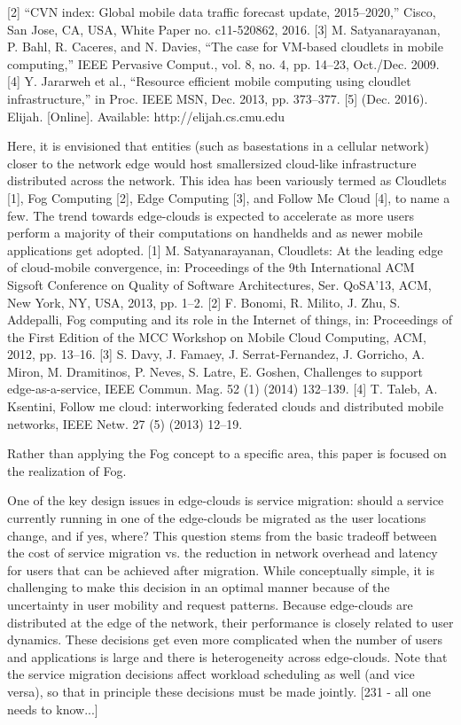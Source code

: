 [2] “CVN index: Global mobile data traffic forecast update, 2015–2020,”
Cisco, San Jose, CA, USA, White Paper no. c11-520862, 2016.
[3] M. Satyanarayanan, P. Bahl, R. Caceres, and N. Davies, “The case for
VM-based cloudlets in mobile computing,” IEEE Pervasive Comput.,
vol. 8, no. 4, pp. 14–23, Oct./Dec. 2009.
[4] Y. Jararweh et al., “Resource efficient mobile computing using cloudlet
infrastructure,” in Proc. IEEE MSN, Dec. 2013, pp. 373–377.
[5] (Dec. 2016). Elijah. [Online]. Available: http://elijah.cs.cmu.edu




Here,
it is envisioned that entities (such as basestations in a cellular network) closer to the network edge would host smallersized
cloud-like infrastructure distributed across the network. This idea has been variously termed as Cloudlets [1], Fog Computing [2], Edge Computing [3], and Follow Me Cloud [4], to name a few. The trend towards edge-clouds is expected
to accelerate as more users perform a majority of their computations on handhelds and as newer mobile applications get
adopted.
[1] M. Satyanarayanan, Cloudlets: At the leading edge of cloud-mobile convergence, in: Proceedings of the 9th International ACM Sigsoft Conference on
Quality of Software Architectures, Ser. QoSA’13, ACM, New York, NY, USA, 2013, pp. 1–2.
[2] F. Bonomi, R. Milito, J. Zhu, S. Addepalli, Fog computing and its role in the Internet of things, in: Proceedings of the First Edition of the MCC Workshop
on Mobile Cloud Computing, ACM, 2012, pp. 13–16.
[3] S. Davy, J. Famaey, J. Serrat-Fernandez, J. Gorricho, A. Miron, M. Dramitinos, P. Neves, S. Latre, E. Goshen, Challenges to support edge-as-a-service, IEEE
Commun. Mag. 52 (1) (2014) 132–139.
[4] T. Taleb, A. Ksentini, Follow me cloud: interworking federated clouds and distributed mobile networks, IEEE Netw. 27 (5) (2013) 12–19.


Rather than applying
the Fog concept to a specific area, this paper is focused on
the realization of Fog.

One of the key design issues in edge-clouds is service migration: should a service currently running in one of the edge-clouds
be migrated as the user locations change, and if yes, where? This question stems from the basic tradeoff between the
cost of service migration vs. the reduction in network overhead and latency for users that can be achieved after migration.
While conceptually simple, it is challenging to make this decision in an optimal manner because of the uncertainty in user
mobility and request patterns. Because edge-clouds are distributed at the edge of the network, their performance is closely
related to user dynamics. These decisions get even more complicated when the number of users and applications is large
and there is heterogeneity across edge-clouds. Note that the service migration decisions affect workload scheduling as well
(and vice versa), so that in principle these decisions must be made jointly.
[231 - all one needs to know...]


